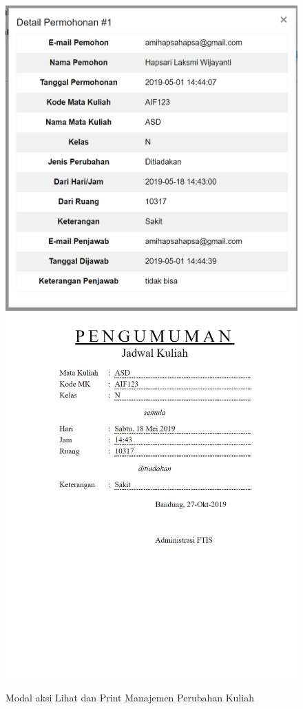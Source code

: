 \documentclass[a4paper,twoside]{article}
\begin{document}
\begin{enumerate}
\begin{tabular}{|p{4cm}|p{2cm}|p{10cm}|}
			\hline
		\end{tabular}
		\begin{figure} [H]
			\centering  
			\includegraphics[scale=0.3]{Modal-Lihat-Manajemen-Perubahan-Kuliah.png}  
			\includegraphics[scale=0.3]{Modal-Print-Manajemen-Perubahan-Kuliah.png} 
			\caption{Modal aksi Lihat dan Print Manajemen Perubahan Kuliah} 
		\end{figure}
		

\end{enumerate}
\end{document}
